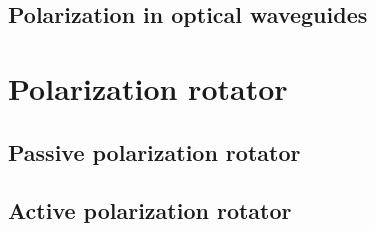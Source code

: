 \documentclass[../report.tex]{subfiles}
\begin{document}
		\subsection{Polarization in optical waveguides}

	\section{Polarization rotator}
	
		\subsection{Passive polarization rotator}
	
		\subsection{Active polarization rotator}
\end{document}
